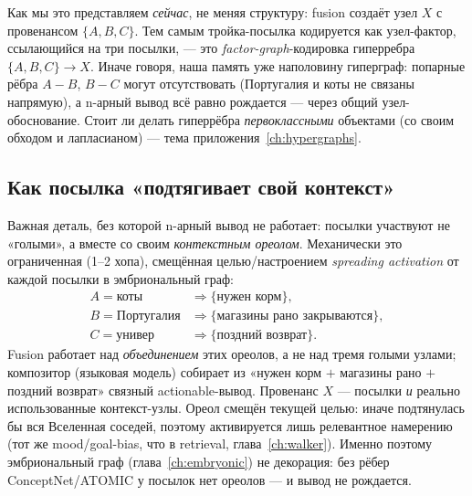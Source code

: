 Как мы это представляем \emph{сейчас}, не меняя структуру: fusion создаёт узел $X$ с
провенансом $\{A,B,C\}$. Тем самым тройка-посылка кодируется как узел-фактор,
ссылающийся на три посылки, — это \emph{factor-graph}-кодировка гиперребра
$\{A,B,C\}\to X$. Иначе говоря, наша память уже наполовину гиперграф: попарные
рёбра $A\!-\!B$, $B\!-\!C$ могут отсутствовать (Португалия и коты не связаны
напрямую), а n-арный вывод всё равно рождается — через общий узел-обоснование.
Стоит ли делать гиперрёбра \emph{первоклассными} объектами (со своим обходом и
лапласианом) — тема приложения~\ref{ch:hypergraphs}.

\begin{center}
\end{center}

\subsection*{Как посылка «подтягивает свой контекст»}

Важная деталь, без которой n-арный вывод не работает: посылки участвуют не «голыми»,
а вместе со своим \emph{контекстным ореолом}. Механически это ограниченная (1--2
хопа), смещённая целью/настроением \emph{spreading activation} от каждой посылки в
эмбриональный граф:
\[
\begin{aligned}
A=\text{коты} &\Rightarrow \{\text{нужен корм}\},\\
B=\text{Португалия} &\Rightarrow \{\text{магазины рано закрываются}\},\\
C=\text{универ} &\Rightarrow \{\text{поздний возврат}\}.
\end{aligned}
\]
Fusion работает над \emph{объединением} этих ореолов, а не над тремя голыми узлами;
композитор (языковая модель) собирает из «нужен корм $+$ магазины рано $+$ поздний
возврат» связный actionable-вывод. Провенанс $X$ — посылки \emph{и} реально
использованные контекст-узлы. Ореол смещён текущей целью: иначе подтянулась бы вся
Вселенная соседей, поэтому активируется лишь релевантное намерению (тот же
mood/goal-bias, что в retrieval, глава~\ref{ch:walker}). Именно поэтому эмбриональный
граф (глава~\ref{ch:embryonic}) не декорация: без рёбер ConceptNet/ATOMIC у посылок
нет ореолов — и вывод не рождается.


